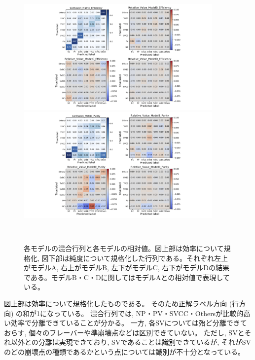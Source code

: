 \begin{figure}[htbp]
 \centering
  \begin{minipage}{1.0\textwidth}
   \centering
    \includegraphics[trim = 300 0 300 0, width=0.9\textwidth, clip]{Figure/3Networks/3-3-3-2ConfusionMatrix_1.png}
   \end{minipage}
   
   \begin{minipage}{1.0\textwidth}
   \centering
    \includegraphics[trim = 300 0 300 0, width=0.9\textwidth, clip]{Figure/3Networks/3-3-3-2ConfusionMatrix_2.png}
   \end{minipage}
  \caption[各モデルの混合行列と各モデルの相対値]{各モデルの混合行列と各モデルの相対値。図上部は効率について規格化, 図下部は純度について規格化した行列である。それぞれ左上がモデルA, 右上がモデルB, 左下がモデルC, 右下がモデルDの結果である。モデルB・C・Dに関してはモデルAとの相対値で表現している。}
  \label{3-3-3-2ConfusionMatrix}
\end{figure}

図上部は効率について規格化したものである。
そのため正解ラベル方向 (行方向) の和が1になっている。
混合行列では, NP・PV・SVCC・Othersが比較的高い効率で分離できていることが分かる。
一方, 各SVについては殆ど分離できておらす, 個々のフレーバーや準崩壊点などは区別できていない。
ただし, SVとそれ以外との分離は実現できており, SVであることは識別できているが, それがSVのどの崩壊点の種類であるかという点については識別が不十分となっている。

